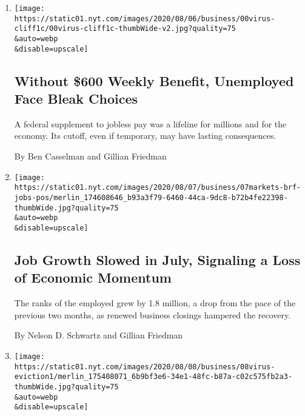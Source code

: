 \begin{enumerate}
\def\labelenumi{\arabic{enumi}.}
\item
  \href{/2020/08/08/business/economy/lost-unemployment-benefits.html}{}

  \texttt{[image: https://static01.nyt.com/images/2020/08/06/business/00virus-cliff1c/00virus-cliff1c-thumbWide-v2.jpg?quality=75\\\&auto=webp\\\&disable=upscale]}

  \hypertarget{without-600-weekly-benefit-unemployed-face-bleak-choices}{%
  \subsection{Without \$600 Weekly Benefit, Unemployed Face Bleak
  Choices}\label{without-600-weekly-benefit-unemployed-face-bleak-choices}}

  A federal supplement to jobless pay was a lifeline for millions and
  for the economy. Its cutoff, even if temporary, may have lasting
  consequences.

  By Ben Casselman and Gillian Friedman
\item
  \href{/2020/08/07/business/economy/july-jobs-report.html}{}

  \texttt{[image: https://static01.nyt.com/images/2020/08/07/business/07markets-brf-jobs-pos/merlin\_174608646\_b93a3f79-6460-44ca-9dc8-b72b4fe22398-thumbWide.jpg?quality=75\\\&auto=webp\\\&disable=upscale]}

  \hypertarget{job-growth-slowed-in-july-signaling-a-loss-of-economic-momentum}{%
  \subsection{Job Growth Slowed in July, Signaling a Loss of Economic
  Momentum}\label{job-growth-slowed-in-july-signaling-a-loss-of-economic-momentum}}

  The ranks of the employed grew by 1.8 million, a drop from the pace of
  the previous two months, as renewed business closings hampered the
  recovery.

  By Nelson D. Schwartz and Gillian Friedman
\item
  \href{/2020/08/07/business/economy/housing-economy-eviction-renters.html}{}

  \texttt{[image: https://static01.nyt.com/images/2020/08/08/business/08virus-eviction1/merlin\_175408071\_6b9bf3e6-34e1-48fc-b87a-c02c575fb2a3-thumbWide.jpg?quality=75\\\&auto=webp\\\&disable=upscale]}

  \hypertarget{millions-of-evictions-are-a-sharper-threat-as-government-support-ends}{%
}
\end{enumerate}
